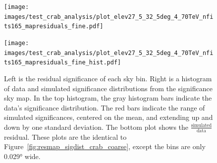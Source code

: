 \begin{figure}[h]
  \centering
  \hfill
  \begin{minipage}{0.4\textwidth}
    \centering
    \texttt{[image: images/test\_crab\_analysis/plot\_elev27\_5\_32\_5deg\_4\_70TeV\_nfits165\_mapresiduals\_fine.pdf]}
  \end{minipage}
  \hfill
  \begin{minipage}{0.45\textwidth}
    \centering
    \texttt{[image: images/test\_crab\_analysis/plot\_elev27\_5\_32\_5deg\_4\_70TeV\_nfits165\_mapresiduals\_fine\_hist.pdf]}
  \end{minipage}
  \hfill
  \hfill
  \caption[Crab Residual Sky Map and Distribution, Fine Binning]{
    Left is the residual significance of each sky bin.
    Right is a histogram of data and simulated significance distributions from the significance sky map.
    In the top histogram, the gray histogram bars indicate the data's significance distribution.
    The red bars indicate the range of simulated significances, centered on the mean, and extending up and down by one standard deviation.
    The bottom plot shows the $\frac{\textrm{simulated}}{\textrm{data}}$ residual.
    These plots are the identical to Figure~\ref{fig:resmap_sigdist_crab_coarse}, except the bins are only \ang{0.029} wide.
  }
  \label{fig:resmap_sigdist_crab_fine}
\end{figure}



